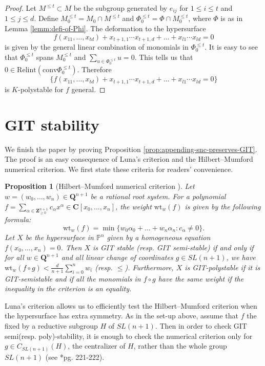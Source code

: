\documentclass[letterpaper,11pt]{amsart}
\theoremstyle{plain}
\newtheorem{prop}[theo]{Proposition}
\theoremstyle{definition}
\theoremstyle{remark}
\newcommand{\PP}{\mathbb{P}}
\newcommand{\QQ}{\mathbf{Q}}
\newcommand{\CC}{\mathbf{C}}
\newcommand{\ZZ}{\mathbf{Z}}
\begin{document}
    \begin{proof}
        Let $M^{\leq t} \subset M$ be the subgroup generated by $e_{ij}$ for $1 \leq i \leq t$ and $1 \leq j \leq d$. Define $M_{0}^{\leq t} = M_{0} \cap M^{\leq t}$ and $\Phi_{0}^{\leq t} = \Phi \cap M_{0}^{\leq t}$, where $\Phi$ is as in Lemma \ref{lemm:defi-of-Phi}. The deformation to the hypersurface
        $$f(x_{11},\ldots, x_{td}) + x_{t+1,1}\cdots x_{t+1,d} + \ldots + x_{l1} \cdots x_{ld} = 0$$
        is given by the general linear combination of monomials in $\Phi_{0}^{\leq t}$. It is easy to see that $\Phi_{0}^{\leq t}$ spans $M_{0}^{\leq t}$ and $\sum_{u \in \Phi_{0}^{\leq t}} u = 0$. This tells us that $0 \in \mathrm{Relint} (\mathrm{conv} \Phi_{0}^{\leq t})$. Therefore
        $$ \{ f(x_{11},\ldots, x_{td}) + x_{t+1,1}\cdots x_{t+1,d} + \ldots + x_{l1} \cdots x_{ld} = 0 \} $$
        is $K$-polystable for $f$ general.
    \end{proof}

    \section{GIT stability}
    We finish the paper by proving Proposition \ref{prop:appending-snc-preserves-GIT}. The proof is an easy consequence of Luna's criterion and the Hilbert--Mumford numerical criterion. We first state these criteria for readers' convenience.

    \begin{prop}[Hilbert--Mumford numerical criterion \cite{Mumford:GIT}]
        Let $w = (w_{0},\ldots, w_{n}) \in \QQ^{n+1}$ be a rational root system. For a polynomial $f = \sum_{\alpha \in \ZZ_{\geq 0}^{n+1}} c_{\alpha} x^{\alpha} \in \CC[x_{0},\ldots, x_{n}]$, the weight $\mathrm{wt}_{w}(f)$ is given by the following formula:
        $$ \mathrm{wt}_{w}(f) = \min \{ w_{0}\alpha_{0} + \ldots + w_{n}\alpha_{n} : c_{\alpha} \neq 0 \}.$$
        Let $X$ be the hypersurface in $\PP^{n}$ given by a homogeneous equation $f(x_{0},\ldots,x_{n}) = 0$. Then $X$ is GIT stable (resp.\! GIT semi-stable) if and only if for all $w \in \QQ^{n+1}$ and all linear change of coordinates $g \in SL(n+1)$, we have $\mathrm{wt}_{w}(f \circ g) < \frac{d}{n+1} \sum_{i=0}^{n} w_{i}$ (resp.\! $\leq$). Furthermore, $X$ is GIT-polystable if it is GIT-semistable and if all the monomials in $f \circ g$ have the same weight if the inequality in the criterion is an equality.
    \end{prop}

    Luna's criterion allows us to efficiently test the Hilbert--Mumford criterion when the hypersurface has extra symmetry. As in the set-up above, assume that $f$ the fixed by a reductive subgroup $H$ of $SL(n+1)$. Then in order to check GIT semi(resp.\! poly)-stability, it is enough to check the numerical criterion only for $g \in C_{SL(n+1)}(H)$, the centralizer of $H$, rather than the whole group $SL(n+1)$ (see \cite{Popov:invariant-theory}*{pg. 221-222}).
\end{document}
